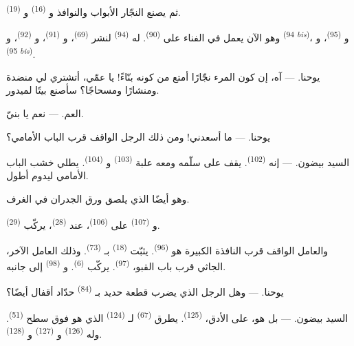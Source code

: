 ثم يصنع النجّار الأبواب والنوافذ و
\textsuperscript{(16)} و \textsuperscript{(19)}.

وهو الآن يعمل في الفناء على  \textsuperscript{(90)}. له
 \textsuperscript{(94)} لنشر  \textsuperscript{(69)}،
و \textsuperscript{(91)}، و \textsuperscript{(92)}،
و \textsuperscript{(94 \textit{bis})}، و
\textsuperscript{(95)}، و \textsuperscript{(95 \textit{bis})}.

\textsc{يوحنا}. --- آه، إن كون المرء نجّارًا أمتع من كونه بنّاءً! يا عمّي،
أتشتري لي منضدة ومنشارًا ومسحاجًا؟ سأصنع بيتًا لميدور.

\textsc{العم}. --- نعم يا بنيّ.

\textsc{يوحنا}. --- ما أسعدني! ومن ذلك الرجل الواقف قرب الباب الأمامي؟

\VUsaut{3.0mm}
\VUsaut{3.0mm}

\textsc{السيد بيضون}. --- إنه  \textsuperscript{(102)}. يقف على
سلّمه ومعه علبة  \textsuperscript{(103)} و
\textsuperscript{(104)}. يطلي خشب الباب الأمامي ليدوم أطول.

وهو أيضًا الذي يلصق ورق الجدران في الغرف.

و \textsuperscript{(107)} على  \textsuperscript{(106)}،
عند  \textsuperscript{(28)}، يركّب  \textsuperscript{(29)}.

والعامل الواقف قرب النافذة الكبيرة هو  \textsuperscript{(96)}.
يثبّت  \textsuperscript{(18)} بـ \textsuperscript{(73)}.
وذلك العامل الآخر، الجاثي قرب باب القبو، 
\textsuperscript{(97)}. يركّب  \textsuperscript{(6)}. و
\textsuperscript{(98)} إلى جانبه.

\textsc{يوحنا}. --- وهل الرجل الذي يضرب قطعة حديد بـ
\textsuperscript{(84)} حدّاد أقفال أيضًا؟

\textsc{السيد بيضون}. --- بل هو، على الأدق،  \textsuperscript{(125)}.
يطرق  \textsuperscript{(67)} لـ
\textsuperscript{(124)} الذي هو فوق سطح  \textsuperscript{(51)}. وله
 \textsuperscript{(126)} و \textsuperscript{(127)}
و \textsuperscript{(128)}.

